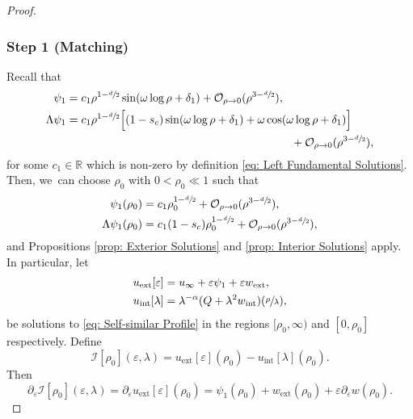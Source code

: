 \documentclass[10pt]{amsart}
\theoremstyle{plain}
\theoremstyle{definition}
\DeclareMathOperator{\exterior}{ext}
\DeclareMathOperator{\interior}{int}
\begin{document}
\skpt
\begin{proof}\vspace*{-5pt}
\subsubsection*{Step 1 (Matching)}
Recall that\vspace*{-3pt}
\begin{equation}
\label{eq: Asymptote of psi_1}
\begin{aligned}
\psi_1&= c_1\rho^{1-\sfrac{d}{2}}\sin(\omega\log\rho+\delta_1)+\mathcal O_{\rho\to 0}(\rho^{3-\sfrac{d}{2}}),\\
\Lambda \psi_1&=c_1 \rho^{1-\sfrac{d}{2}}\Big[(1-s_c)\sin(\omega\log\rho+\delta_1)+\omega\cos(\omega\log\rho+\delta_1)\Big]\\
&\hspace*{7cm}+\mathcal O_{\rho\to 0}(\rho^{3-\sfrac{d}{2}}),
\end{aligned}
\end{equation}
for some $c_1\in\mathbb R$ which is non-zero by definition \eqref{eq: Left Fundamental Solutions}. Then, we~can choose $\rho_0$ with $0<\rho_0\ll 1$ such that\vspace*{-3pt}
\begin{equation}
\label{intiialirnot}
\begin{aligned}
\psi_1(\rho_0)&=c_1\rho_0^{1-\sfrac{d}{2}}+\mathcal O_{\rho\to 0}(\rho^{3-\sfrac{d}{2}}),\\
\Lambda\psi_1(\rho_0)&=c_1(1-s_c)\rho_0^{1-\sfrac{d}{2}}+\mathcal O_{\rho\to 0}(\rho^{3-\sfrac{d}{2}}),
\end{aligned}
\end{equation}
and Propositions \ref{prop: Exterior Solutions} and \ref{prop: Interior Solutions} apply. In particular, let
\[
\begin{aligned}
u_{\exterior}[\varepsilon] &=u_\infty +\varepsilon \psi_1+\varepsilon w_{\exterior},\\
u_{\interior}[\lambda] &=\lambda^{-\alpha}(Q+\lambda^2 w_{\interior})(\sfrac{\rho}{\lambda}),
\end{aligned}
\]
be solutions to \eqref{eq: Self-similar Profile} in the regions $[\rho_0,\infty)$ and $[0,\rho_0]$ respectively. Define
\[
\mathcal I[\rho_0](\varepsilon,\lambda)=u_{\exterior}[\varepsilon](\rho_0)-u_{\interior}[\lambda](\rho_0).
\]
Then
\[
\partial_\varepsilon \mathcal I[\rho_0](\varepsilon,\lambda)=\partial_\varepsilon u_{\exterior}[\varepsilon](\rho_0)=\psi_1(\rho_0)+w_{\exterior}(\rho_0)+\varepsilon\partial_\varepsilon w(\rho_0).
\]
\end{proof}
\end{document}

